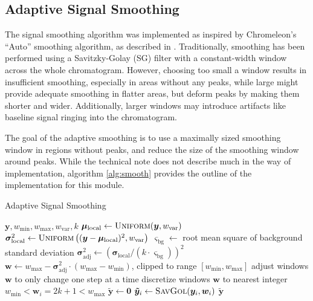 \documentclass{article}
\begin{document}
\subsection{Adaptive Signal Smoothing}\label{sec:smooth}
The signal smoothing algorithm was implemented as inspired by Chromeleon's ``Auto'' smoothing algorithm, as described in \cite{cobra}. Traditionally, smoothing has been performed using a Savitzky-Golay (SG) filter with a constant-width window across the whole chromatogram. However, choosing too small a window results in insufficient smoothing, especially in areas without any peaks, while large might provide adequate smoothing in flatter areas, but deform peaks by making them shorter and wider. Additionally, larger windows may introduce artifacts like baseline signal ringing into the chromatogram.

The goal of the adaptive smoothing is to use a maximally sized smoothing window in regions without peaks, and reduce the size of the smoothing window around peaks. While the technical note does not describe much in the way of implementation, algorithm \ref{alg:smooth} provides the outline of the implementation for this module. 

\begin{algorithm}[t]
\caption{Adaptive Signal Smoothing}\label{alg:smooth}
\begin{algorithmic}
\Require $\bm{y}, w_\text{min}, w_\text{max}, w_\text{var}, k$
\State $\bm{\mu}_\text{local} \gets \textsc{Uniform}(\bm{y},w_\text{var})$ 
\State $\bm{\sigma}^2_\text{local} \gets \textsc{Uniform}\left((\bm{y} - \bm{\mu}_\text{local})^2,w_\text{var}\right)$ 
\State $\varsigma_\text{bg} \gets$ root mean square of background standard deviation
\State $\bm{\sigma}^2_\text{adj} \gets (\bm{\sigma}_\text{local}/(k \cdot \varsigma_\text{bg}))^2$
\State $\bm{w} \gets w_\text{max} - \bm{\sigma}^2_\text{adj} \cdot (w_\text{max} - w_\text{min}) $, clipped to range $[w_\text{min}, w_\text{max}]$
\State adjust windows $\bm{w}$ to only change one step at a time
\State discretize windows $\bm{w}$ to nearest integer $ w_\text{min} < \bm{w}_i = 2k+1 < w_\text{max}$
\State $\mathbf{\tilde{y}} \gets \mathbf{0}$
  \State $\bm{\tilde{y}}_i \gets \textsc{SavGol}(\bm{y}_i, \bm{w}_i)$
\EndFor
\Return $\bm{\tilde{y}}$
\end{algorithmic}
\end{algorithm}
\end{document}
